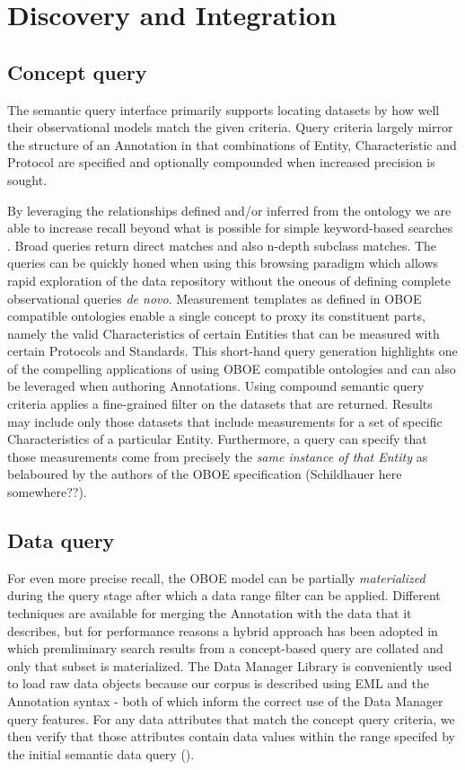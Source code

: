 
\section{Discovery and Integration}
\label{sec:application}

\subsection{Concept query}
The semantic query interface primarily supports locating datasets by how well their observational models match the given criteria. Query criteria largely mirror the structure of an Annotation in that combinations of Entity, Characteristic and Protocol are specified and optionally compounded when increased precision is sought. 

By leveraging the relationships defined and/or inferred from the
ontology we are able to increase recall beyond what is possible for
simple keyword-based searches
\cite{berkley09:_improv_data_discov_for_metad}. Broad queries return
direct matches and also n-depth subclass matches. The queries can be
quickly honed when using this browsing paradigm which allows rapid
exploration of the data repository without the oneous of defining
complete observational queries \emph{de novo}. Measurement templates
as defined in OBOE compatible ontologies enable a single concept to
proxy its constituent parts, namely the valid Characteristics of
certain Entities that can be measured with certain Protocols and
Standards. This short-hand query generation highlights one of the
compelling applications of using OBOE compatible ontologies and can
also be leveraged when authoring Annotations.  Using compound semantic
query criteria applies a fine-grained filter on the datasets that are
returned. Results may include only those datasets that include
measurements for a set of specific Characteristics of a particular
Entity. Furthermore, a query can specify that those measurements come
from precisely the \emph{same instance of that Entity} as belaboured
by the authors of the OBOE specification (Schildhauer here
somewhere??).

\subsection{Data query}
For even more precise recall, the OBOE model can be partially \emph{materialized} during the query stage after which a data range filter can be applied. Different techniques are available for merging the Annotation with the data that it describes, but for performance reasons a hybrid approach has been adopted in which premliminary search results from a concept-based query are collated and only that subset is materialized. The Data Manager Library is conveniently used to load raw data objects because our corpus is described using EML and the Annotation syntax - both of which inform the correct use of the Data Manager query features. For any data attributes that match the concept query criteria, we then verify that those attributes contain data values within the range specifed by the initial semantic data query ().

